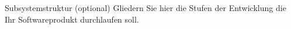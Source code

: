Subsystemstruktur (optional)
Gliedern Sie hier die Stufen der Entwicklung die Ihr Softwareprodukt durchlaufen soll.
